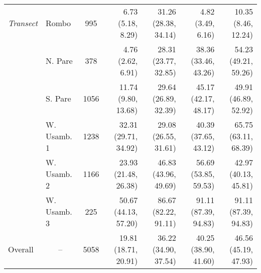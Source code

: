 \begin{tabular}{llcrrrr}
\textit{Transect}                              & Rombo       &   995    & 6.73 (5.18, 8.29)      & 31.26 (28.38, 34.14)   & 4.82 (3.49, 6.16)      & 10.35 (8.46, 12.24)    \\
                                               & N. Pare     &   378    & 4.76 (2.62, 6.91)      & 28.31 (23.77, 32.85)   & 38.36 (33.46, 43.26)   & 54.23 (49.21, 59.26)   \\
                                               & S. Pare     &   1056   & 11.74 (9.80, 13.68)    & 29.64 (26.89, 32.39)   & 45.17 (42.17, 48.17)   & 49.91 (46.89, 52.92)   \\
                                               & W. Usamb. 1 &   1238   & 32.31 (29.71, 34.92)   & 29.08 (26.55, 31.61)   & 40.39 (37.65, 43.12)   & 65.75 (63.11, 68.39)   \\
                                               & W. Usamb. 2 &   1166   & 23.93 (21.48, 26.38)   & 46.83 (43.96, 49.69)   & 56.69 (53.85, 59.53)   & 42.97 (40.13, 45.81)   \\
                                               & W. Usamb. 3 &   225    & 50.67 (44.13, 57.20)   & 86.67 (82.22, 91.11)   & 91.11 (87.39, 94.83)   & 91.11 (87.39, 94.83)   \\
Overall                           & \multicolumn{1}{c}{--}   &   5058   & 19.81 (18.71, 20.91)   & 36.22 (34.90, 37.54)   & 40.25 (38.90, 41.60)   & 46.56 (45.19, 47.93)   \\
\bottomrule
\end{tabular}